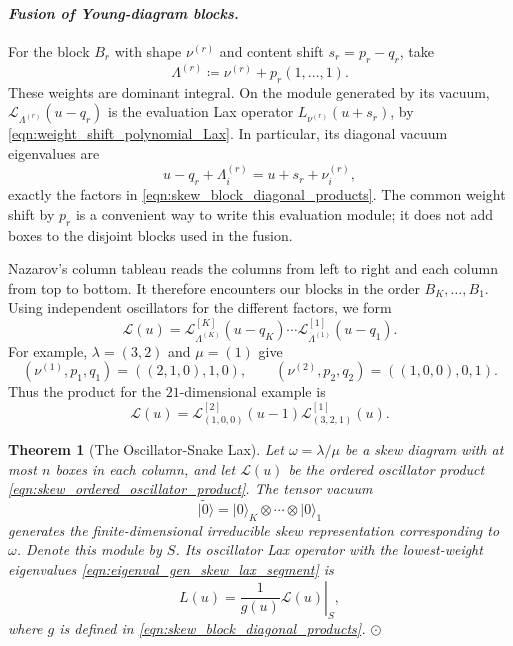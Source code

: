 \documentclass[12pt,reqno]{amsart}
\newcommand{\ket}[1]{{| #1 \rangle}}      %
\numberwithin{equation}{section}
\newtheorem{thm}{Theorem}[section]
\begin{document}
\paragraph{\textit{Fusion of Young-diagram blocks.}} \leavevmode\par
For the block $B_r$ with shape $\nu^{(r)}$ and content shift
$s_r=p_r-q_r$, take
\begin{equation}
	\Lambda^{(r)}\coloneqq\nu^{(r)}+p_r(1,\ldots,1).
	\label{eqn:skew_block_oscillator_weights}
\end{equation}
These weights are dominant integral. On the module generated by
its vacuum, $\mathcal L_{\Lambda^{(r)}}(u-q_r)$ is the evaluation
Lax operator $L_{\nu^{(r)}}(u+s_r)$, by
\eqref{eqn:weight_shift_polynomial_Lax}. In particular, its diagonal
vacuum eigenvalues are
\begin{equation*}
	u-q_r+\Lambda_i^{(r)}=u+s_r+\nu_i^{(r)},
\end{equation*}
exactly the factors in \eqref{eqn:skew_block_diagonal_products}.
The common weight shift by $p_r$ is a convenient way to write this
evaluation module; it does not add boxes to the disjoint blocks
used in the fusion.

Nazarov's column tableau reads the columns from left to right and
each column from top to bottom. It therefore encounters our blocks
in the order $B_K,\ldots,B_1$. Using independent oscillators for
the different factors, we form
\begin{equation}
	\mathcal L(u)=
	\mathcal L_{\Lambda^{(K)}}^{[K]}(u-q_K)\cdots
	\mathcal L_{\Lambda^{(1)}}^{[1]}(u-q_1).
	\label{eqn:skew_ordered_oscillator_product}
\end{equation}
For example, $\lambda=(3,2)$ and $\mu=(1)$ give
\begin{equation*}
	(\nu^{(1)},p_1,q_1)=((2,1,0),1,0),
	\qquad
	(\nu^{(2)},p_2,q_2)=((1,0,0),0,1).
\end{equation*}
Thus the product for the $21$-dimensional example is
\begin{equation*}
	\mathcal L(u)=
	\mathcal L_{(1,0,0)}^{[2]}(u-1)
	\mathcal L_{(3,2,1)}^{[1]}(u).
\end{equation*}

\begin{thm}[The Oscillator-Snake Lax]
	\label{thm:Osc_Lax}
	Let $\omega=\lambda/\mu$ be a skew diagram with at most $n$ boxes
	in each column, and let $\mathcal L(u)$ be the ordered oscillator
	product \eqref{eqn:skew_ordered_oscillator_product}. The tensor
	vacuum
	\begin{equation*}
		\ket{\widetilde0}=\ket0_K\otimes\cdots\otimes\ket0_1
	\end{equation*}
	generates the finite-dimensional irreducible skew representation
	corresponding to $\omega$. Denote this module by $S$. Its oscillator Lax
	operator with the lowest-weight eigenvalues
	\eqref{eqn:eigenval_gen_skew_lax_segment} is
	\begin{equation*}
		L(u)=\left.\frac{1}{g(u)}\mathcal L(u)\right|_S,
	\end{equation*}
	where $g$ is defined in \eqref{eqn:skew_block_diagonal_products}.
	$\odot$
\end{thm}
\end{document}
